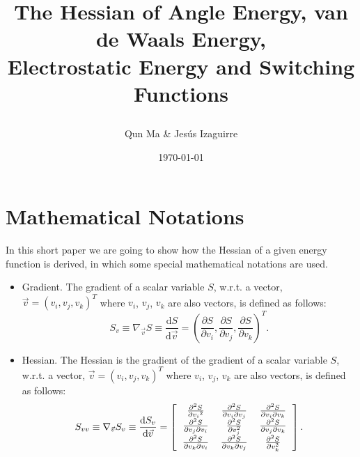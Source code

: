 \documentclass[11pt]{article}
\begin{document}
\title{
\begin{Large}
The Hessian of Angle Energy,
van de Waals Energy, \\ Electrostatic Energy 
and Switching Functions
\end{Large}
}
\author{Qun Ma \& Jes\'us Izaguirre}
\bigskip
\date{\today}
\maketitle

\parskip 0.3cm


\section{Mathematical Notations}
In this short paper we are going to show how the Hessian of a given
energy function is derived, in which some special mathematical notations 
are used. 
\begin{itemize}
\item Gradient. The gradient of a scalar variable $S$, w.r.t. a vector, 
$\vec{v} = (v_i, v_j, v_k)^T$ where $v_i$, $v_j$, $v_k$ are also
vectors, is defined as follows:
\begin{equation}
S_v \equiv \nabla_{\vec{v}} S \equiv \frac{\mathrm{d}S}
{\mathrm{d}\vec{v}} =
(\frac{\partial S}{\partial {v_i}},\frac{\partial S}{\partial v_j},
\frac{\partial S}{\partial v_k})^T. 
\end{equation}
\item Hessian. The Hessian is the gradient of the gradient of a scalar
variable $S$, w.r.t. a vector, 
$\vec{v} = (v_i, v_j, v_k)^T$ where $v_i$, $v_j$, $v_k$ are also
vectors, is defined as follows:
\begin{equation}
S_{vv} \equiv \nabla_{\vec{v}} S_v 
       \equiv \frac{\mathrm{d} S_v}{\mathrm{d} \vec{v}} =
\left[
\begin{tabular}{c c c}
$\frac{\partial^2 S}{\partial {v_i}^2}$ &
$\frac{\partial^2 S}{\partial {v_i} \partial {v_j}} $&
$\frac{\partial^2 S}{\partial {v_i} \partial {v_k}} $\\
$\frac{\partial^2 S}{\partial {v_j} \partial {v_i}} $&
$\frac{\partial^2 S}{\partial v_j^2} $&
$\frac{\partial^2 S}{\partial {v_j} \partial {v_k}} $\\
$\frac{\partial^2 S}{\partial {v_k} \partial {v_i}} $&
$\frac{\partial^2 S}{\partial {v_k} \partial {v_j}} $&
$\frac{\partial^2 S}{\partial v_k^2}$
\end{tabular}
\right]. 
\end{equation} 
\end{itemize}
\end{document}
